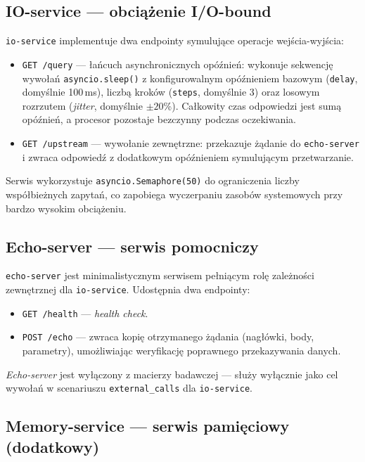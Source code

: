 \subsection{IO-service — obciążenie I/O-bound}

\texttt{io-service} implementuje dwa endpointy symulujące operacje wejścia-wyjścia:

\begin{itemize}
  \item \texttt{GET /query} — łańcuch asynchronicznych opóźnień: wykonuje sekwencję wywołań \texttt{asyncio.sleep()} z konfigurowalnym opóźnieniem bazowym (\texttt{delay}, domyślnie 100\,ms), liczbą kroków (\texttt{steps}, domyślnie 3) oraz losowym rozrzutem (\textit{jitter}, domyślnie $\pm20$\%). Całkowity czas odpowiedzi jest sumą opóźnień, a procesor pozostaje bezczynny podczas oczekiwania.
  \item \texttt{GET /upstream} — wywołanie zewnętrzne: przekazuje żądanie do \texttt{echo-server} i zwraca odpowiedź z dodatkowym opóźnieniem symulującym przetwarzanie.
\end{itemize}

Serwis wykorzystuje \texttt{asyncio.Semaphore(50)} do ograniczenia liczby współbieżnych zapytań, co zapobiega wyczerpaniu zasobów systemowych przy bardzo wysokim obciążeniu.

\subsection{Echo-server — serwis pomocniczy}

\texttt{echo-server} jest minimalistycznym serwisem pełniącym rolę zależności zewnętrznej dla \texttt{io-service}. Udostępnia dwa endpointy:

\begin{itemize}
  \item \texttt{GET /health} — \textit{health check}.
  \item \texttt{POST /echo} — zwraca kopię otrzymanego żądania (nagłówki, body, parametry), umożliwiając weryfikację poprawnego przekazywania danych.
\end{itemize}

\textit{Echo-server} jest wyłączony z macierzy badawczej — służy wyłącznie jako cel wywołań w scenariuszu \texttt{external\_calls} dla \texttt{io-service}.

\subsection{Memory-service — serwis pamięciowy (dodatkowy)}

